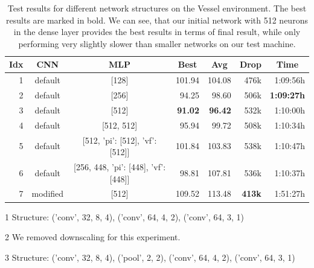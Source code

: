 \begin{table}[htp]
    \begin{center}
        \begin{threeparttable}
            \begin{tabular}{rccrrrr}
                \toprule
                \multicolumn{1}{c}{Idx} & \multicolumn{1}{c}{CNN} & \multicolumn{1}{c}{MLP} & \multicolumn{1}{c}{Best} & \multicolumn{1}{c}{Avg} & \multicolumn{1}{c}{Drop} & \multicolumn{1}{c}{Time}\\
                \midrule
                1 & default\tnote{1} & [128] & 101.94 & 104.08 & 476k & 1:09:56h \\
                2 & default\tnote{1} & [256] & 94.25 & 98.60 & 506k & \textbf{1:09:27h} \\
                3 & default\tnote{1} & [512] & \textbf{91.02} & \textbf{96.42} & 532k & 1:10:00h \\
                4 & default\tnote{1} & [512, 512] & 95.94 & 99.72 & 508k & 1:10:34h \\
                5 & default\tnote{1} & [512, {'pi': [512], 'vf': [512]}] & 101.84 & 103.83 & 538k & 1:10:47h \\
                6 & default\tnote{1} & [256, 448, {'pi': [448], 'vf': [448]}] & 98.81 & 107.81 & 536k & 1:10:37h \\
                7\tnote{2} & modified\tnote{3} & [512] & 109.52 & 113.48 & \textbf{413k} & 1:51:27h \\
                \bottomrule
            \end{tabular}
            \begin{tablenotes} \footnotesize
                \item[1] Structure: ('conv', 32, 8, 4), ('conv', 64, 4, 2), ('conv', 64, 3, 1)
                \item[2] We removed downscaling for this experiment.
                \item[3] Structure: ('conv', 32, 8, 4), ('pool', 2, 2), ('conv', 64, 4, 2), ('conv', 64, 3, 1)
            \end{tablenotes}

        \end{threeparttable}
        
    \end{center}
    \caption[Test Results for Different Network Structures on the Vessel Environment]{Test results for different network structures on the Vessel environment. The best results are marked in bold. We can see, that our initial network with 512 neurons in the dense layer provides the best results in terms of final result, while only performing very slightly slower than smaller networks on our test machine.} \label{tab:Eval/NetworkStructure/Vessel}
\end{table}

